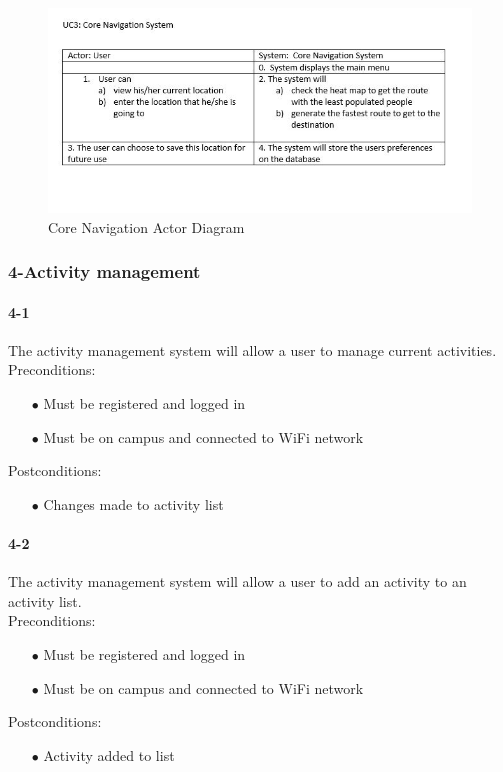 \documentclass[a4paper,12pt]{article}
\begin{document}
\begin{figure}[H]
\includegraphics[width=\textwidth]{ActorDiagrams/CoreNavAD.JPG}
\caption{Core Navigation Actor Diagram}
\label{fig:Core Navigation Actor Diagram}
\end{figure}


\subsubsection{4-Activity management}

\paragraph{4-1}
The activity management system will allow a user to manage current activities.\\
Preconditions:
\begin{itemize}
	\item[$\bullet$] Must be registered and logged in
	\item[$\bullet$] Must be on campus and connected to WiFi network
\end{itemize}
Postconditions:
\begin{itemize}
	\item[$\bullet$] Changes made to activity list
\end{itemize}
\paragraph{4-2}
The activity management system will allow a user to add an activity to an activity list.\\
Preconditions:
\begin{itemize}
	\item[$\bullet$] Must be registered and logged in
	\item[$\bullet$] Must be on campus and connected to WiFi network
\end{itemize}
Postconditions:
\begin{itemize}
	\item[$\bullet$] Activity added to list
\end{itemize}
\end{document}
